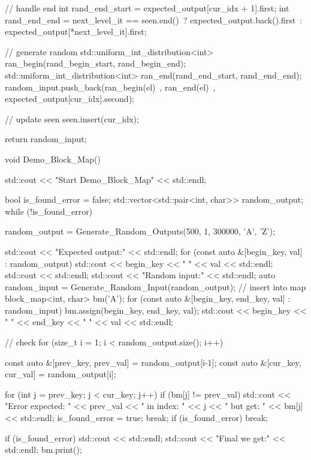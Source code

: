 \begin{Code}
{{        // handle end
        int rand_end_start = expected_output[cur_idx + 1].first;
        int rand_end_end = next_level_it == seen.end()\
                            ? expected_output.back().first\
                             : expected_output[*next_level_it].first;

        // generate random
        std::uniform_int_distribution<int> ran_begin(rand_begin_start, rand_begin_end);
        std::uniform_int_distribution<int> ran_end(rand_end_start, rand_end_end);
        random_input.push_back({ran_begin(el)\
                                , ran_end(el)\
                                , expected_output[cur_idx].second});

        // update seen
        seen.insert(cur_idx);
    }

    return random_input;
}

void Demo_Block_Map()
{
    std::cout << "Start Demo_Block_Map" << std::endl;

    bool is_found_error = false;
    std::vector<std::pair<int, char>> random_output;
    while (!is_found_error)
    {
        random_output = Generate_Random_Outputs(500, 1, 300000, 'A', 'Z');

        std::cout << "Expected output:" << std::endl;
        for (const auto &[begin_key, val] : random_output)
        {
            std::cout << begin_key << " " << val << std::endl;
        }
        std::cout << std::endl;
        std::cout << "Random input:" << std::endl;
        auto random_input = Generate_Random_Input(random_output);
        // insert into map
        block_map<int, char> bm('A');
        for (const auto &[begin_key, end_key, val] : random_input)
        {
            bm.assign(begin_key, end_key, val);
            std::cout << begin_key << " " << end_key << " " << val << std::endl;
        }

        // check
        for (size_t i = 1; i < random_output.size(); i++)
        {
            const auto &[prev_key, prev_val] = random_output[i-1];
            const auto &[cur_key, cur_val] = random_output[i];

            for (int j = prev_key; j < cur_key; j++)
            {
                if (bm[j] != prev_val)
                {
                    std::cout << "Error expected: " << prev_val
                              << " in index: " << j
                              << " but get: " << bm[j] << std::endl;
                    is_found_error = true;
                    break;
                }
            }
            if (is_found_error)
                break;
        }
        if (is_found_error)
        {
            std::cout << std::endl;
            std::cout << "Final we get:" << std::endl;
            bm.print();
        }
    }
}

\end{Code}